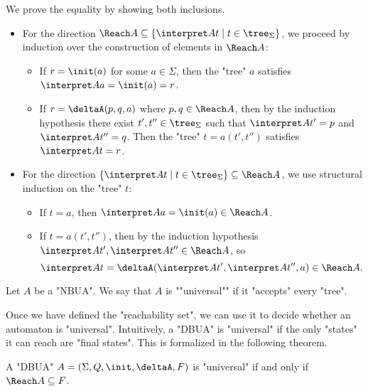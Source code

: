 \documentclass[a4paper,UKenglish,cleveref, autoref, thm-restate]{lipics-v2021}
\begin{document}
\begin{proofI}
	We prove the equality by showing both inclusions.
	\begin{itemize}
		\item For the direction $\Reach A \subseteq \setdef {\interpret A t} {t \in \tree_\Sigma}$, we proceed by induction over the construction of elements in $\Reach A$:
		      \begin{itemize}
			      \item If $r = \init(a)$ for some $a \in \Sigma$, then the "tree" $a$ satisfies $\interpret A a = \init(a) = r$.
			      \item If $r = \deltaA(p, q, a)$ where $p, q \in \Reach A$, then by the induction hypothesis there exist
			            $t', t'' \in \tree_\Sigma$ such that $\interpret A {t'} = p$ and $\interpret A {t''} = q$. Then the "tree" $t = a(t', t'')$ satisfies $\interpret A t = r$.
		      \end{itemize}

		\item For the direction $\setdef {\interpret A t} {t \in \tree_\Sigma} \subseteq \Reach A$, we use structural induction on the "tree" $t$:
		      \begin{itemize}
			      \item If $t = a$, then $\interpret A a = \init(a) \in \Reach A$.
			      \item If $t = a(t', t'')$, then by the induction hypothesis $\interpret A {t'}, \interpret A {t''} \in \Reach A$, so
			            \[
				            \interpret A t = \deltaA(\interpret A {t'}, \interpret A {t''}, a) \in \Reach A.
			            \]
		      \end{itemize}
	\end{itemize}
\end{proofI}

\begin{definition}
	\AP Let $A$ be a "NBUA". We say that $A$ is ""universal"" if it "accepts" every "tree".
\end{definition}

Once we have defined the "reachability set", we can use it to decide whether an automaton is "universal". Intuitively, a "DBUA" is "universal" if
the only "states" it can reach are "final states". This is formalized in the following theorem.

\begin{theorem}
	A "DBUA" $A = \DBUA$ is "universal" if and only if $\Reach A \subseteq F$.
\end{theorem}
\end{document}
